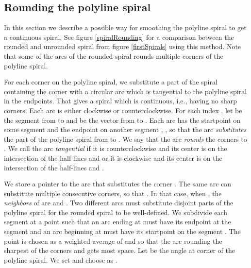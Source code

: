 \documentclass[3p]{elsarticle}
\begin{document}
\subsection{Rounding the polyline spiral}\label{rounding}

In this section we describe a possible way for smoothing the polyline spiral to get a
 continuous spiral.
See figure \ref{spiralRounding} for a comparison between the rounded and unrounded spiral from figure
\ref{firstSpirals} using this method.
Note that some of the arcs of the rounded spiral rounds multiple corners
of the polyline spiral.

For each corner on the polyline spiral, we substitute a part of the spiral containing the corner with a
circular arc which is tangential to the polyline spiral in the endpoints.
That gives a spiral which is  continuous, i.e., having no sharp corners. Each arc is either
clockwise or counterclockwise. For each index , let
 be the segment from  to  and
 be the vector from  to .
Each arc has the startpoint  on some segment  and the endpoint 
on another segment , , so that the arc \emph{substitutes} the part of the
polyline spiral from  to . We say that the arc \emph{rounds} the corners
 to .
We call the arc \emph{tangential} if it is counterclockwise and its center is on the intersection of the
half-lines  and  or it is
clockwise and its center is on the intersection of the half-lines
 and .

We store a pointer  to the arc that substitutes the corner .
The same arc can substitute multiple consecutive corners, so that
.
In that case, when ,
the \emph{neighbors} of  are  and .
Two different arcs must substitute disjoint parts of the polyline spiral
for the rounded spiral to be well-defined. We subdivide each segment
 at a point  such that an arc ending at
 must have its endpoint at the segment  and an arc
beginning at  must have its startpoint on the segment
. The point  is chosen as a weighted average of  and
 so that the arc rounding the sharpest of the corners  and 
gets most space. Let  be the angle at corner  of the polyline spiral.
We set  and choose  as
.
\end{document}
